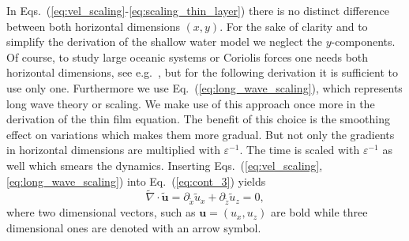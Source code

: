 In Eqs.~(\ref{eq:vel_scaling}-\ref{eq:scaling_thin_layer}) there is no distinct difference between both horizontal dimensions $(x,y)$. 
For the sake of clarity and to simplify the derivation of the shallow water model we neglect the $y$-components.
Of course, to study large oceanic systems or Coriolis forces one needs both horizontal dimensions, see e.g.~\cite{dellarShallowWaterEquations2005, marcheDerivationNewTwodimensional2007}, but for the following derivation it is sufficient to use only one.
Furthermore we use Eq.~(\ref{eq:long_wave_scaling}), which represents long wave theory or scaling. 
We make use of this approach once more in the derivation of the thin film equation.
The benefit of this choice is the smoothing effect on variations which makes them more gradual. 
But not only the gradients in horizontal dimensions are multiplied with $\varepsilon^{-1}$.
The time is scaled with $\varepsilon^{-1}$ as well which smears the dynamics.
Inserting Eqs.~(\ref{eq:vel_scaling},\ref{eq:long_wave_scaling}) into Eq.~(\ref{eq:cont_3}) yields
\begin{equation}\label{eq:rescaled_cont}
    \tilde{\nabla}\cdot\tilde{\mathbf{u}} = \partial_{\tilde{x}} \tilde{u}_x + \partial_{\tilde{z}} \tilde{u}_z  = 0,
\end{equation}
where two dimensional vectors, such as $\mathbf{u} = (u_x, u_z)$ are bold while three dimensional ones are denoted with an arrow symbol.

